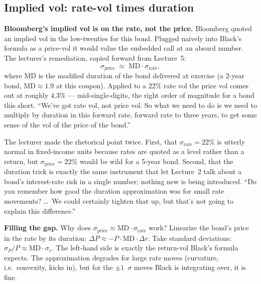 \subsection{Implied vol: rate-vol times duration}\label{L6-sec:freddie-vol}

\begin{keyblock}
\textbf{Bloomberg's implied vol is on the rate, not the price.}
Bloomberg quoted an implied vol in the low-twenties for this bond.
Plugged naively into Black's formula as a price-vol it would value the
embedded call at an absurd number. The lecturer's remediation, copied
forward from Lecture~5:
\[
  \sigma_{\text{price}} \;\approx\; \mathrm{MD} \cdot \sigma_{\text{rate}},
\]
where $\mathrm{MD}$ is the modified duration of the bond delivered at
exercise (a 2-year bond, $\mathrm{MD} \approx 1.9$ at this coupon).
Applied to a $22\%$ rate vol the price vol comes out at roughly
$4.3\%$ --- mid-single-digits, the right order of magnitude for a
bond this short. ``We've got rate vol, not price vol. So what we need
to do is we need to multiply by duration in this forward rate, forward
rate to three years, to get some sense of the vol of the price of the
bond.''
\end{keyblock}

The lecturer made the rhetorical point twice. First, that
$\sigma_{\text{rate}} = 22\%$ is utterly normal in fixed-income units
because rates are quoted as a level rather than a return, but
$\sigma_{\text{price}} = 22\%$ would be wild for a 5-year bond.
Second, that the duration trick is exactly the same instrument that
let Lecture~2 talk about a bond's interest-rate risk in a single
number; nothing new is being introduced. ``Do you remember how good
the duration approximation was for small rate movements? \ldots\ We
could certainly tighten that up, but that's not going to explain
this difference.''

\begin{tipblock}
\textbf{Filling the gap.} Why does $\sigma_{\text{price}} \approx
\mathrm{MD}\cdot\sigma_{\text{rate}}$ work? Linearize the bond's price
in the rate by its duration: $\Delta P \approx -P\cdot \mathrm{MD}
\cdot \Delta r$. Take standard deviations: $\sigma_P / P \approx
\mathrm{MD} \cdot \sigma_r$. The left-hand side is exactly the
return-vol Black's formula expects. The approximation degrades for
large rate moves (curvature, i.e.\ convexity, kicks in), but for the
$\pm 1$~$\sigma$ moves Black is integrating over, it is fine.
\end{tipblock}

